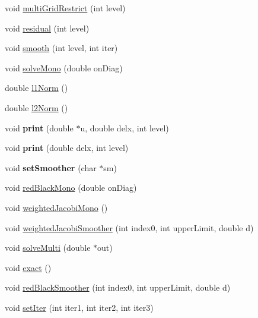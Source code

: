 \begin{DoxyCompactItemize}
\item 
void \mbox{\hyperlink{classMultiGrid_a4ae7a3a7c3898e86465d635f379f5828}{multi\+Grid\+Restrict}} (int level)
\item 
void \mbox{\hyperlink{classMultiGrid_a605e0a32f5f979b781b4a4b70c9c90f2}{residual}} (int level)
\item 
void \mbox{\hyperlink{classMultiGrid_afc18e9c07fe4359bcdb5d7999ef9672b}{smooth}} (int level, int iter)
\item 
void \mbox{\hyperlink{classMultiGrid_a679ace3c3a59b2c7e93708f6db0b237c}{solve\+Mono}} (double on\+Diag)
\item 
double \mbox{\hyperlink{classMultiGrid_a147206a8dd140649ef797a241d4ee258}{l1\+Norm}} ()
\item 
double \mbox{\hyperlink{classMultiGrid_a23ea3051d3d9a3fb43f2725b6e9f9efc}{l2\+Norm}} ()
\item 
\mbox{\label{classMultiGrid_a8a2bfe3f2f4787c85bc17c0810ae4683}} 
void {\bfseries print} (double $\ast$u, double delx, int level)
\item 
\mbox{\label{classMultiGrid_afa99ba5495e246f1b1c2102ab719f687}} 
void {\bfseries print} (double delx, int level)
\item 
\mbox{\label{classMultiGrid_ac889eb3d68b716c93752d9d776873882}} 
void {\bfseries set\+Smoother} (char $\ast$sm)
\item 
void \mbox{\hyperlink{classMultiGrid_ac50d33d6af2436397cba05e0eecc02c2}{red\+Black\+Mono}} (double on\+Diag)
\item 
void \mbox{\hyperlink{classMultiGrid_ade19e917a66caba115c0fb1975ae9906}{weighted\+Jacobi\+Mono}} ()
\item 
void \mbox{\hyperlink{classMultiGrid_a7a81c22ab36afae5dc0b926423b6a91f}{weighted\+Jacobi\+Smoother}} (int index0, int upper\+Limit, double d)
\item 
void \mbox{\hyperlink{classMultiGrid_a6b14d3f7da004282770fd7606bd06a27}{solve\+Multi}} (double $\ast$out)
\item 
void \mbox{\hyperlink{classMultiGrid_a2c347faf3e1df3ec3dc30948550ec215}{exact}} ()
\item 
void \mbox{\hyperlink{classMultiGrid_aadd3312395446c9d0a1dcad780205844}{red\+Black\+Smoother}} (int index0, int upper\+Limit, double d)
\item 
void \mbox{\hyperlink{classMultiGrid_a5d3162dc383c2031dbd52395fb12edaf}{set\+Iter}} (int iter1, int iter2, int iter3)

\end{DoxyCompactItemize}
